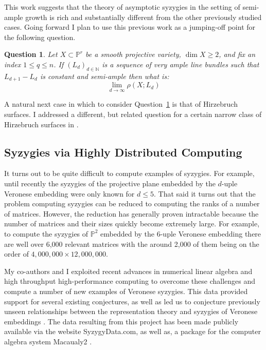 \documentclass[10pt,reqno]{amsart}
\newtheorem{question}[lemma]{Question}
\theoremstyle{remark}
\newcommand{\N}{\mathbb{N}}
\renewcommand{\P}{\mathbb{P}}
\begin{document}
This work suggests that the theory of asymptotic syzygies in the setting of semi-ample growth is rich and substantially different from the other previously studied cases. Going forward I plan to use this previous work as a jumping-off point for the following question.  

\begin{question}\label{quest:semi-ample}
Let $X\subset \P^r$ be a smooth projective variety, $\dim X \geq2$, and fix an index $1\leq q \leq n$. If $(L_{d})_{d\in\N}$ is a sequence of very ample line bundles such that $L_{d+1}-L_{d}$ is constant and semi-ample then what is:
\[
\lim_{d\to\infty} \rho\left(X;L_{d}\right)
\]
\end{question}

A natural next case in which to consider Question~\ref{quest:semi-ample} is that of Hirzebruch surfaces. I addressed a different, but related question for a certain narrow class of Hirzebruch surfaces in \cite{bruce19-hirzebruch}.

\subsection{Syzygies via Highly Distributed Computing}

It turns out to be quite difficult to compute examples of syzygies. For example, until recently the syzygies of the projective plane embedded by the $d$-uple Veronese embedding were only known for $d\leq 5$. That said it turns out that the problem computing syzygies can be reduced to computing the ranks of a number of matrices. However, the reduction has generally proven intractable because the number of matrices and their sizes quickly become extremely large. For example, to compute the syzygies of $\P^2$ embedded by the $6$-uple Veronese embedding there are well over 6,000 relevant matrices with the around 2,000 of them being on the order of $4,000,000 \times 12,000,000$. 

My co-authors and I exploited recent advances in numerical linear algebra and high throughput high-performance computing to overcome these challenges and compute a number of new examples of Veronese syzygies. This data provided support for several existing conjectures, as well as led us to conjecture previously unseen relationships between the representation theory and syzygies of Veronese embeddings \cite{bruceErmanGoldsteinYang18}. 
The data resulting from this project has been made publicly available via the website SyzygyData.com, as well as, a package for the computer algebra system Macaualy2 \cite{bruceErman19}.
\end{document}
